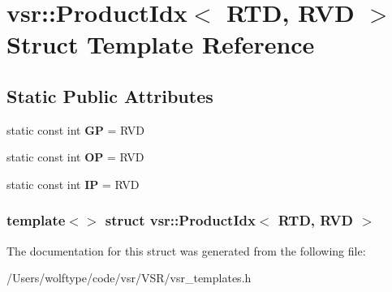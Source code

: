 \hypertarget{structvsr_1_1_product_idx_3_01_r_t_d_00_01_r_v_d_01_4}{\section{vsr\-:\-:Product\-Idx$<$ R\-T\-D, R\-V\-D $>$ Struct Template Reference}
\label{structvsr_1_1_product_idx_3_01_r_t_d_00_01_r_v_d_01_4}
}
\subsection*{Static Public Attributes}
\begin{DoxyCompactItemize}
\item 
\hypertarget{structvsr_1_1_product_idx_3_01_r_t_d_00_01_r_v_d_01_4_ae3a6d9e8aeed4a34f90422a4affd162b}{static const int {\bfseries G\-P} = R\-V\-D}\label{structvsr_1_1_product_idx_3_01_r_t_d_00_01_r_v_d_01_4_ae3a6d9e8aeed4a34f90422a4affd162b}

\item 
\hypertarget{structvsr_1_1_product_idx_3_01_r_t_d_00_01_r_v_d_01_4_a366c1ac5f470b72300c460b3fd10041b}{static const int {\bfseries O\-P} = R\-V\-D}\label{structvsr_1_1_product_idx_3_01_r_t_d_00_01_r_v_d_01_4_a366c1ac5f470b72300c460b3fd10041b}

\item 
\hypertarget{structvsr_1_1_product_idx_3_01_r_t_d_00_01_r_v_d_01_4_a9c101a5dc80ded4bba08f00edadcc5eb}{static const int {\bfseries I\-P} = R\-V\-D}\label{structvsr_1_1_product_idx_3_01_r_t_d_00_01_r_v_d_01_4_a9c101a5dc80ded4bba08f00edadcc5eb}

\end{DoxyCompactItemize}
\subsubsection*{template$<$$>$ struct vsr\-::\-Product\-Idx$<$ R\-T\-D, R\-V\-D $>$}



The documentation for this struct was generated from the following file\-:\begin{DoxyCompactItemize}
\item 
/\-Users/wolftype/code/vsr/\-V\-S\-R/vsr\-\_\-templates.\-h\end{DoxyCompactItemize}
